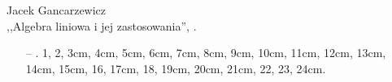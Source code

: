 \documentclass[a4paper,11pt]{article}
\newcommand{\cm}{\checkmark}
\begin{document}
\begin{center}
Jacek Gancarzewicz\\
,,Algebra liniowa i jej zastosowania'', \cite{JGALJZ}.
\end{center}
\begin{itemize}
\item[--]  . 1, 2, 3cm, 4cm, 5cm, 6cm, 7cm, 8cm, 9cm, 10cm, 11cm, 12cm, 13cm, 14cm, 15cm, 16, 17cm, 18, 19cm, 20cm, 21cm, 22, 23, 24cm.
\end{itemize}
\end{document}
